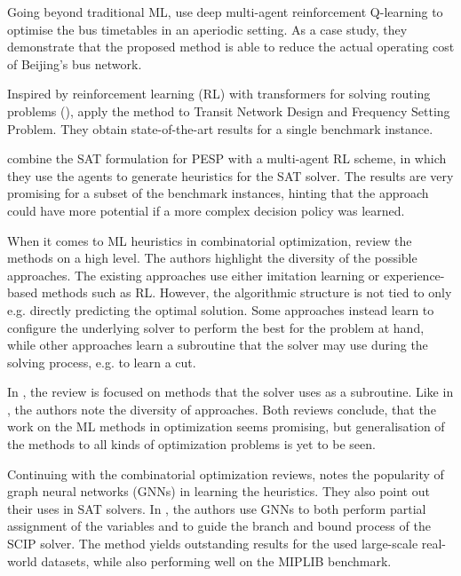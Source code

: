 \documentclass[english, 12pt, a4paper, sci, utf8, a-2b, online]{aaltothesis}
\begin{document}
Going beyond traditional ML, \cite{DRL-timetabling-yan2022distributed} use deep multi-agent reinforcement Q-learning to optimise the bus timetables in an aperiodic setting. As a case study, they demonstrate that the proposed method is able to reduce the actual operating cost of Beijing's bus network.

Inspired by reinforcement learning (RL) with transformers for solving routing problems (\cite{kool2018attention}), \cite{darwish2020optimising} apply the method to Transit Network Design and Frequency Setting Problem. They obtain state-of-the-art results for a single benchmark instance.

\cite{matos2021solving} combine the SAT formulation for PESP with a multi-agent RL scheme, in which they use the agents to generate heuristics for the SAT solver. The results are very promising for a subset of the benchmark instances, hinting that the approach could have more potential if a more complex decision policy was learned.


When it comes to ML heuristics in combinatorial optimization, \cite{BENGIO2021405} review the methods on a high level. The authors highlight the diversity of the possible approaches. The existing approaches use either imitation learning or experience-based methods such as RL. However, the algorithmic structure is not tied to only e.g. directly predicting the optimal solution. Some approaches instead learn to configure the underlying solver to perform the best for the problem at hand, while other approaches learn a subroutine that the solver may use during the solving process, e.g. to learn a cut. 

In \cite{ZHANG2023205}, the review is focused on methods that the solver uses as a subroutine. Like in \cite{BENGIO2021405}, the authors note the diversity of approaches. Both reviews conclude, that the work on the ML methods in optimization seems promising, but generalisation of the methods to all kinds of optimization problems is yet to be seen.

Continuing with the combinatorial optimization reviews, \cite{cappart2023combinatorial} notes the popularity of graph neural networks (GNNs) in learning the heuristics. They also point out their uses in SAT solvers. In \cite{nair2020solving}, the authors use GNNs to both perform partial assignment of the variables and to guide the branch and bound process of the SCIP solver. The method yields outstanding results for the used large-scale real-world datasets, while also performing well on the MIPLIB benchmark.
\end{document}
